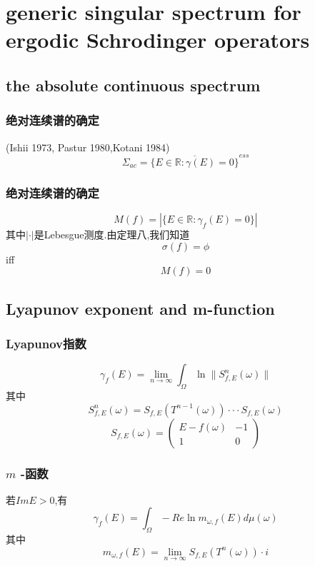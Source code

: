 \documentclass[compress,mathserif,red]{beamer}
\begin{document}
\section{generic singular spectrum for ergodic Schrodinger operators} %
\subsection{the absolute continuous spectrum} %


\begin{frame}
\frametitle{绝对连续谱的确定}
\begin{theorem} (Ishii 1973, Pastur 1980,Kotani 1984)
$$\Sigma_{ac}={\overline{ \{ E \in \mathbb{R}:\gamma(E)=0 \} }}^{ess}$$
\end{theorem}

\end{frame}

\begin{frame}
\frametitle{绝对连续谱的确定}

$$M(f)=|\{E \in \mathbb{R} :\gamma_f(E)=0 \} |$$
其中$| \cdot |$是Lebesgue测度.由定理八,我们知道
$$\sigma(f)=\phi$$
iff
$$M(f)=0$$

\end{frame}


\subsection{Lyapunov exponent and m-function} %
\begin{frame}
\frametitle{Lyapunov指数}
$$\gamma_f(E)=\lim_{n\to\infty}\int_\Omega \ln \| S^n_{f,E} (\omega) \|$$
其中
$$S^n_{f,E} (\omega)=S_{f,E}(T^{n-1}(\omega)) \cdot \cdot \cdot S_{f,E}(\omega)$$
$$S_{f,E}(\omega)=\left( \begin{array}{ccc}
E-f(\omega) & -1  \\

1 & 0  \end{array} \right) $$
\end{frame}

\begin{frame}
\frametitle{$m$ -函数}
若$Im E>0$,有
$$\gamma_f(E)=\int_\Omega -Re \ln m_{\omega,f}(E)d\mu(\omega)$$
其中
$$ m_{\omega,f}(E)=\lim_{n\to\infty}S_{f,E}(T^{n}(\omega))\cdot i $$


\end{frame}
\end{document}
